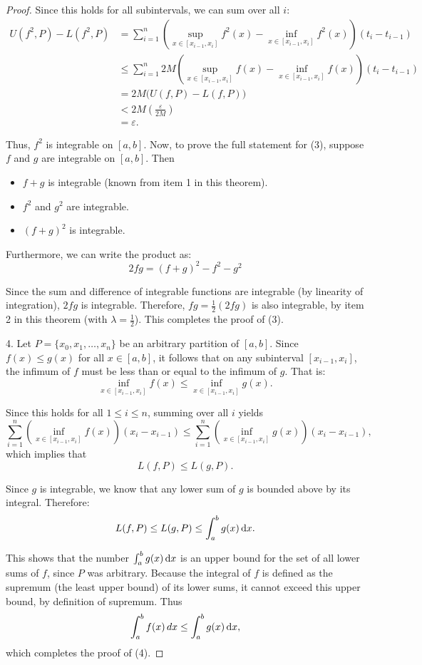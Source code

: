 \documentclass[../analysis1.tex]{subfiles}
\begin{document}
\begin{proof}
Since this holds for all subintervals, we can sum over all $i$:
\begin{align*}
    U(f^2, P) - L(f^2, P) &= \sum_{i=1}^n \left( \sup_{x \in [x_{i-1}, x_i]} f^2(x) - \inf_{x \in [x_{i-1}, x_i]} f^2(x) \right) (t_i - t_{i-1}) \\
    &\leq \sum_{i=1}^n 2M \left( \sup_{x \in [x_{i-1}, x_i]} f(x) - \inf_{x \in [x_{i-1}, x_i]} f(x) \right) (t_i - t_{i-1}) \\
    &= 2M \big( U(f, P) - L(f, P) \big) \\
    &< 2M \left( \frac{\varepsilon}{2M} \right) \\
    &= \varepsilon.
\end{align*}

Thus, $f^2$ is integrable on $[a,b]$. Now, to prove the full statement for (3), suppose $f$ and $g$ are integrable on $[a,b]$. Then
\begin{itemize}
    \item $f+g$ is integrable (known from item 1 in this theorem).
    \item $f^2$ and $g^2$ are integrable.
    \item $(f+g)^2$ is integrable.
\end{itemize}
Furthermore, we can write the product as:
\[ 2fg = (f+g)^2 - f^2 - g^2 \]

Since the sum and difference of integrable functions are integrable (by linearity of integration), $2fg$ is integrable. Therefore, $fg = \frac{1}{2}(2fg)$ is also integrable, by item 2 in this theorem (with $\lambda = \frac{1}{2}$). This completes the proof of (3).\hfill \qedsymbol

4. Let $P = \{x_0, x_1, \dots, x_n\}$ be an arbitrary partition of $[a, b]$. Since $f(x) \leq g(x)$ for all $x \in [a, b]$, it follows that on any subinterval $[x_{i-1}, x_i]$, the infimum of $f$ must be less than or equal to the infimum of $g$. That is:
\[ \inf_{x \in [x_{i-1}, x_i]} f(x) \le \inf_{x \in [x_{i-1}, x_i]} g(x). \]

Since this holds for all $1\le i\le n$, summing over all $i$ yields
\[ \sum_{i=1}^n \left( \inf_{x \in [x_{i-1}, x_i]} f(x) \right)(x_i-x_{i - 1}) \le \sum_{i=1}^n \left( \inf_{x \in [x_{i-1}, x_i]} g(x) \right)(x_{i}-x_{i - 1}),\]
which implies that
\[ L(f, P) \leq L(g, P). \]

Since $g$ is integrable, we know that any lower sum of $g$ is bounded above by its integral. Therefore:
\[ L(f, P) \leq L(g, P) \leq \int_a^b g(x) \d{x}. \]

This shows that the number $\int_a^b g(x) \d{x}$ is an upper bound for the set of all lower sums of $f$, since $P$ was arbitrary. Because the integral of $f$ is defined as the supremum (the least upper bound) of its lower sums, it cannot exceed this upper bound, by definition of supremum. Thus
\[ \int_a^b f(x) \,dx \leq \int_a^b g(x) \d{x}, \]
which completes the proof of (4).\hfill \qedsymbol


\end{proof}
\end{document}
